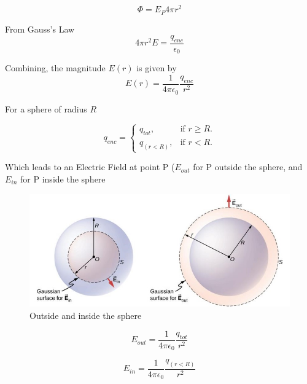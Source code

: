 \documentclass[14pt]{memoir}
\begin{document}
\begin{equation}
\Phi = E_P 4 \pi r^2
\end{equation}

From Gauss's Law
\begin{equation}
4 \pi r^2 E = \frac{q_{enc}}{\epsilon_0}
\end{equation}

Combining, the magnitude $E(r)$ is given by
\begin{equation}
E(r) = \frac{1}{4 \pi \epsilon_0}\frac{q_{enc}}{r^2}
\end{equation}

For a sphere of radius $R$

\begin{equation}
  q_{enc}=\begin{cases}
    q_{tot}, & \text{if } r \geq R.\\
    q_{(r<R)}, & \text{if } r < R.
  \end{cases}
\end{equation}

Which leads to an Electric Field at point P ($E_{out}$ for P outside the sphere, and $E_{in}$ for P inside the sphere

\begin{figure}[H]
\begin{center}
\includegraphics[scale=0.60]{fig/fig_06_23.jpg}
\caption{Outside and inside the sphere}
\label{fig:06_23}
\end{center}
\end{figure}

\begin{equation}
E_{out} = \frac{1}{4 \pi \epsilon_0}\frac{q_{tot}}{r^2}
\end{equation}

\begin{equation}
E_{in} = \frac{1}{4 \pi \epsilon_0}\frac{q_{(r<R)}}{r^2}
\end{equation}
\end{document}

